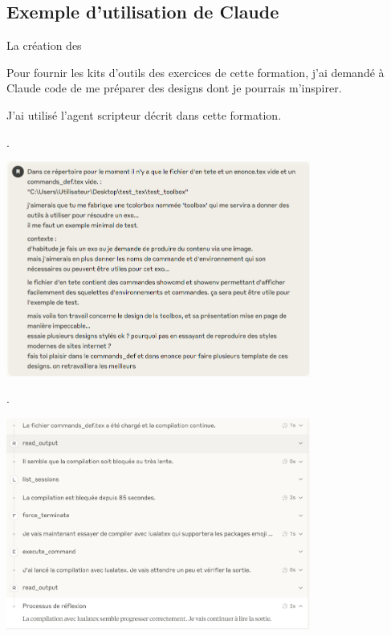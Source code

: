 \subsection{Exemple d'utilisation de Claude}

\begin{bfbox}{La création des }

    Pour fournir les kits d'outils des exercices de cette formation, j'ai demandé à Claude code de me préparer des designs dont je pourrais m'inspirer. 

    J'ai utilisé l'agent scripteur décrit dans cette formation. 

    \begin{tcbenumerate}[2]
        \tcbitem {}. 
        \begin{center}
        \includegraphics[width=0.75\textwidth]{annexes/Example_craft_toolbox/1.png}
        \end{center}
        
        \tcbitem {}. 
        \begin{center}
        \includegraphics[width=0.75\textwidth]{annexes/Example_craft_toolbox/3.png}
        \end{center}


\end{tcbenumerate}
\end{bfbox}
